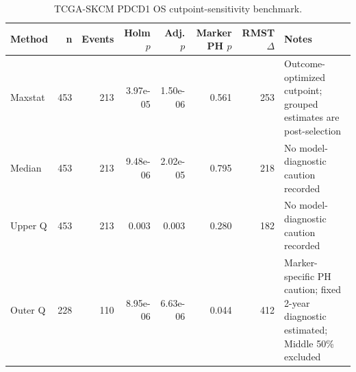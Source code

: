 \begin{table}[t]
\centering
\caption{TCGA-SKCM PDCD1 OS cutpoint-sensitivity benchmark.}
\label{tab:skcm-pdcd1-os-cutpoints}
\begin{tabular}{lrrrrrrl}
\toprule
Method & n & Events & Holm $p$ & Adj. $p$ & Marker PH $p$ & RMST $\Delta$ & Notes \\
\midrule
Maxstat & 453 & 213 & 3.97e-05 & 1.50e-06 & 0.561 & 253 & Outcome-optimized cutpoint; grouped estimates are post-selection \\
Median & 453 & 213 & 9.48e-06 & 2.02e-05 & 0.795 & 218 & No model-diagnostic caution recorded \\
Upper Q & 453 & 213 & 0.003 & 0.003 & 0.280 & 182 & No model-diagnostic caution recorded \\
Outer Q & 228 & 110 & 8.95e-06 & 6.63e-06 & 0.044 & 412 & Marker-specific PH caution; fixed 2-year diagnostic estimated; Middle 50\% excluded \\
\bottomrule
\end{tabular}
\end{table}
